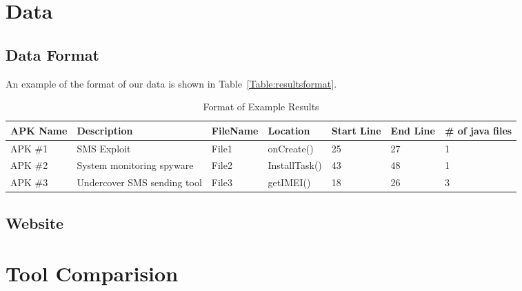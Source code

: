\documentclass{sig-alternate}
\begin{document}
\section{Data}




\subsection{Data Format}



An example of the format of our data is shown in Table~\ref{Table:resultsformat}.


\begin{table*}[t]
  \centering
  \caption{Format of Example Results}
     \begin{tabular}{ l | l | l | l| l| l| l}

	\bfseries APK Name & \bfseries  Description & \bfseries FileName & \bfseries Location & \bfseries Start Line & \bfseries End Line & \bfseries  \# of java files\\ \hline \hline
	
	
	
	APK \#1 & SMS Exploit & File1 & onCreate() & 25 & 27 & 1\\ \hline
	APK \#2 & System monitoring spyware & File2 & InstallTask() & 43 & 48 & 1\\ \hline
	APK \#3 & Undercover SMS sending tool & File3 & getIMEI()  & 18 & 26 & 3\\
	
	
  \end{tabular}
  \label{table:resultsformat}

\end{table*}



\subsection{Website}










\section{Tool Comparision}
\label{sec: toolcomparision}
\end{document}
